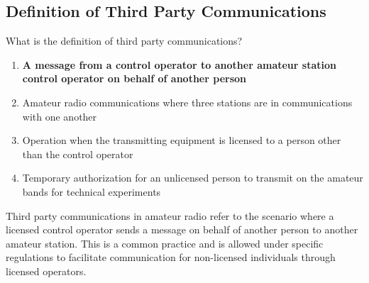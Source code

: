 \subsection{Definition of Third Party Communications}
\label{T1F08}

\begin{tcolorbox}[colback=gray!10!white,colframe=black!75!black,title=T1F08]
What is the definition of third party communications?
\begin{enumerate}[label=\Alph*),noitemsep]
    \item \textbf{A message from a control operator to another amateur station control operator on behalf of another person}
    \item Amateur radio communications where three stations are in communications with one another
    \item Operation when the transmitting equipment is licensed to a person other than the control operator
    \item Temporary authorization for an unlicensed person to transmit on the amateur bands for technical experiments
\end{enumerate}
\end{tcolorbox}

Third party communications in amateur radio refer to the scenario where a licensed control operator sends a message on behalf of another person to another amateur station. This is a common practice and is allowed under specific regulations to facilitate communication for non-licensed individuals through licensed operators.